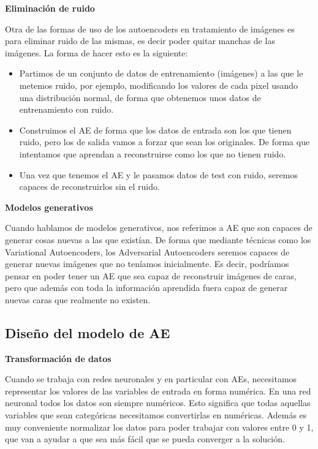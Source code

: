 \documentclass[
  a4paper,
  DIV=11,
  numbers=noendperiod]{scrreprt}
\begin{document}
\textbf{Eliminación de ruido}

Otra de las formas de uso de los autoencoders en tratamiento de imágenes
es para eliminar ruido de las mismas, es decir poder quitar manchas de
las imágenes. La forma de hacer esto es la siguiente:

\begin{itemize}
\item
  Partimos de un conjunto de datos de entrenamiento (imágenes) a las que
  le metemos ruido, por ejemplo, modificando los valores de cada pixel
  usando una distribución normal, de forma que obtenemos unos datos de
  entrenamiento con ruido.
\item
  Construimos el AE de forma que los datos de entrada son los que tienen
  ruido, pero los de salida vamos a forzar que sean los originales. De
  forma que intentamos que aprendan a reconstruirse como los que no
  tienen ruido.
\item
  Una vez que tenemos el AE y le pasamos datos de test con ruido,
  seremos capaces de reconstruirlos sin el ruido.
\end{itemize}

\textbf{Modelos generativos}

Cuando hablamos de modelos generativos, nos referimos a AE que son
capaces de generar cosas nuevas a las que existían. De forma que
mediante técnicas como los Variational Autoencoders, los Adversarial
Autoencoders seremos capaces de generar nuevas imágenes que no teníamos
inicialmente. Es decir, podríamos pensar en poder tener un AE que sea
capaz de reconstruir imágenes de caras, pero que además con toda la
información aprendida fuera capaz de generar nuevas caras que realmente
no existen.

\subsection{Diseño del modelo de AE}\label{diseuxf1o-del-modelo-de-ae}

\textbf{Transformación de datos}

Cuando se trabaja con redes neuronales y en particular con AEs,
necesitamos representar los valores de las variables de entrada en forma
numérica. En una red neuronal todos los datos son siempre numéricos.
Esto significa que todas aquellas variables que sean categóricas
necesitamos convertirlas en numéricas. Además es muy conveniente
normalizar los datos para poder trabajar con valores entre 0 y 1, que
van a ayudar a que sea más fácil que se pueda converger a la solución.
\end{document}
